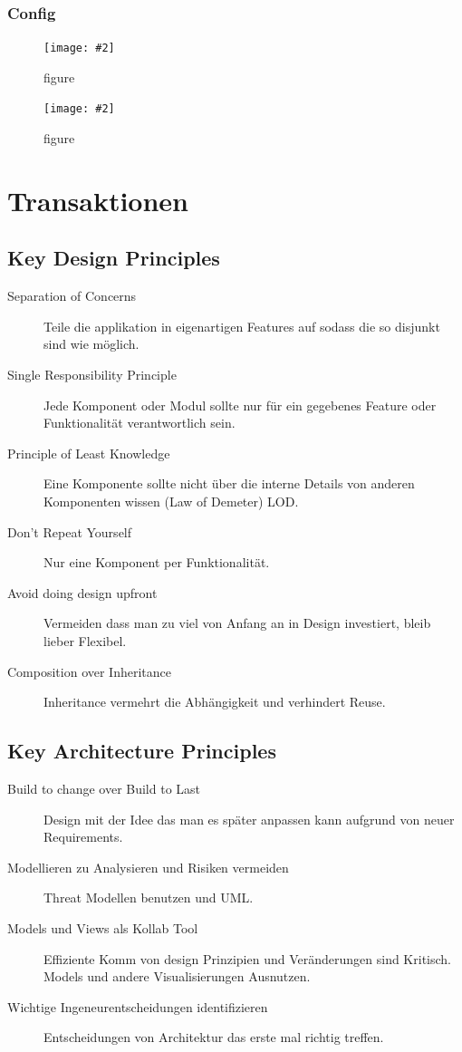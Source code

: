 \documentclass[a4paper,10pt]{scrreprt}
\newcommand{\pic}[2][figure]{\begin{figure}[h]
 \centering
 \texttt{[image: \#2]}
 \caption{#1}
\end{figure}
}
\begin{document}
\subsection{Config}
\pic{conf1.png}
\pic{conf2.png}

\chapter{Transaktionen}

\section{Key Design Principles}
\begin{description}
 \item [Separation of Concerns] Teile die applikation in eigenartigen Features auf sodass die so disjunkt sind wie 
möglich.
\item [Single Responsibility Principle] Jede Komponent oder Modul sollte nur für ein gegebenes Feature oder 
Funktionalität verantwortlich sein.
\item [Principle of Least Knowledge] Eine Komponente sollte nicht über die interne Details von anderen Komponenten 
wissen (Law of Demeter) LOD.
\item [Don't Repeat Yourself] Nur eine Komponent per Funktionalität.
\item[Avoid doing design upfront] Vermeiden dass man zu viel von Anfang an in Design investiert, bleib lieber Flexibel.
\item [Composition over Inheritance] Inheritance vermehrt die Abhängigkeit und verhindert Reuse.
\end{description}
\section{Key Architecture Principles}
\begin{description}
 \item [Build to change over Build to Last] Design mit der Idee das man es später anpassen kann aufgrund von neuer 
Requirements.
\item[Modellieren zu Analysieren und Risiken vermeiden] Threat Modellen benutzen und UML.
\item[Models und Views als Kollab Tool] Effiziente Komm von design Prinzipien und Veränderungen sind Kritisch. Models 
und andere Visualisierungen Ausnutzen.
\item [Wichtige Ingeneurentscheidungen identifizieren] Entscheidungen von Architektur das erste mal richtig treffen.
\end{description}
\end{document}
